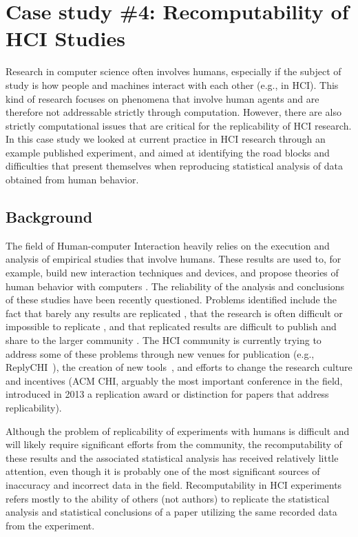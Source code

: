 \section{Case study \#4: Recomputability of HCI Studies}
\label{s:group4}

Research in computer science often involves humans, especially if the subject of study is how people and machines interact with each other (e.g., in HCI). This kind of research focuses on phenomena that involve human agents and are therefore not addressable strictly through computation. However, there are also strictly computational issues that are critical for the replicability of HCI research. In this case study we looked at current practice in HCI research through an example published experiment, and aimed at identifying the road blocks and difficulties that present themselves when reproducing statistical analysis of data obtained from human behavior.  

\subsection{Background}
The field of Human-computer Interaction heavily relies on the execution and analysis of empirical studies that involve humans. These results are used to, for example, build new interaction techniques and devices\cite{}, and propose theories of human behavior with computers \cite{}. The reliability of the analysis and conclusions of these studies have been recently questioned. Problems identified include the fact that barely any results are replicated \cite{hornbaek:replications}, that the research is often difficult or impossible to replicate \cite{wilson1}, and that replicated results are difficult to publish and share to the larger community \cite{}. The HCI community is currently trying to address some of these problems through new venues for publication (e.g., ReplyCHI~\cite{replichiVenue}), the creation of new tools~\cite{mackay}, and efforts to change the research culture and incentives (ACM CHI, arguably the most important conference in the field, introduced in 2013 a replication award or distinction for papers that address replicability).

Although the problem of replicability of experiments with humans is difficult and will likely require significant efforts from the community, the recomputability of these results and the associated statistical analysis has received relatively little attention, even though it is probably one of the most significant sources of inaccuracy and incorrect data in the field. Recomputability in HCI experiments refers mostly to the ability of others (not authors) to replicate the statistical analysis and statistical conclusions of a paper utilizing the same recorded data from the experiment. 

